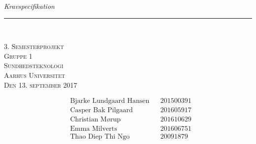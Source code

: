 \thispagestyle{empty}
\begin{flushright}
\vspace{3cm}

\phantom{hul}

\phantom{hul}

\phantom{hul}

\textsl{\Huge Kravspecifikation} \\ \vspace{1cm}

\rule{13cm}{3mm} \\ \vspace{1.5cm}
\vspace{1cm}

\vspace{2cm} 
\textsc{\Large 3. Semesterprojekt \\
Gruppe 1 \\
Sundhedsteknologi \\
Aarhus Universitet \\
Den 13. september 2017 \\
}
\end{flushright}

\vspace*{\fill}

\begin{align*}
&\text{Bjarke Lundgaard Hansen} &&\text{201500391}\\
&\text{Casper Bak Pilgaard} &&\text{201605917}\\
&\text{Christian Mørup} &&\text{201610629}\\
&\text{Emma Milverts} &&\text{201606751}\\
&\text{Thao Diep Thi Ngo} &&\text{20091879}\\
\end{align*}
